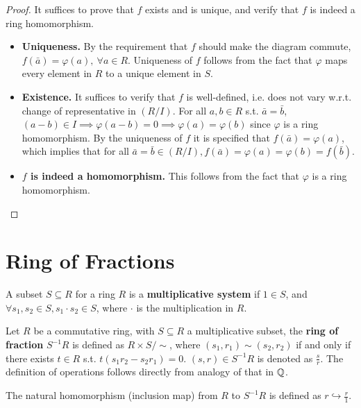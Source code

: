 \documentclass{article}
\begin{document}
\begin{proof}
    It suffices to prove that $f$ exists and is unique, and verify that $f$ is indeed a ring homomorphism.
    \begin{itemize}
        \item \textbf{Uniqueness.} By the requirement that $f$ should make the diagram commute, $f(\bar{a}) = \varphi(a),\ \forall a\in R$. Uniqueness of $f$ follows from the fact that $\varphi$ maps every element in $R$ to a unique element in $S$.
        \item \textbf{Existence.} It suffices to verify that $f$ is well-defined, i.e. does not vary w.r.t. change of representative in $(R/I)$. For all $a, b\in R$ s.t. $\bar{a} = \bar{b}$, $(a - b)\in I \implies \varphi(a - b) = 0 \implies \varphi(a) = \varphi(b)$ since $\varphi$ is a ring homomorphism. By the uniqueness of $f$ it is specified that $f(\bar{a}) = \varphi(a)$, which implies that for all $\bar{a} = \bar{b}\in (R/I), f(\bar{a}) = \varphi(a) = \varphi(b) = f(\bar{b})$.
        \item \textbf{$f$ is indeed a homomorphism.} This follows from the fact that $\varphi$ is a ring homomorphism.
    \end{itemize}
\end{proof}

\newpage
\section{Ring of Fractions}

\begin{definition}
    A subset $S\subseteq R$ for a ring $R$ is a \textbf{multiplicative system} if $1\in S$, and $\forall s_1, s_2\in S, s_1\cdot s_2\in S$, where $\cdot$ is the multiplication in $R$.
\end{definition}

\begin{definition}
    Let $R$ be a commutative ring, with $S\subseteq R$ a multiplicative subset, the \textbf{ring of fraction} $S^{-1}R$ is defined as $R\times S / \sim$, where $(s_1, r_1) \sim (s_2, r_2)$ if and only if there exists $t\in R$ s.t. $t(s_1 r_2 - s_2 r_1) = 0$. $(s, r) \in S^{-1}R$ is denoted as $\frac{s}{r}$. The definition of operations follows directly from analogy of that in $\mathbb{Q}$.

    The natural homomorphism (inclusion map) from $R$ to $S^{-1}R$ is defined as $r \hookrightarrow \frac{r}{1}$.
\end{definition}
\end{document}
